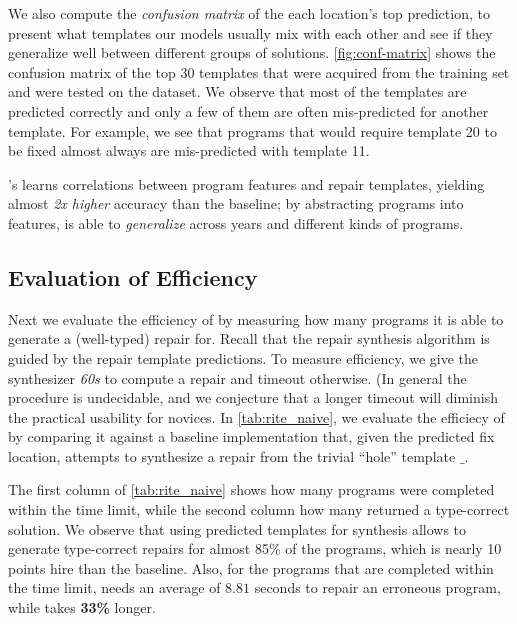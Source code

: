 %
We also compute the \emph{confusion matrix} of the each location's
top prediction, to present what templates our models usually mix
with each other and see if they generalize well between different
groups of solutions.
%
\autoref{fig:conf-matrix} shows the confusion matrix of the
top 30 templates that were acquired from the training set
and were tested on the \FALL dataset.
%
We observe that most of the templates are predicted correctly
and only a few of them are often mis-predicted for another template.
%
For example, we see that programs that would require template 20
to be fixed almost always are mis-predicted with template 11.


\begin{framed}
  \noindent \toolname's learns correlations between program features and repair
  templates, yielding almost \emph{2x higher} accuracy than the baseline;
  by abstracting programs into features, \toolname is able
  to \emph{generalize} across years and different kinds of programs.
\end{framed}


\subsection{Evaluation of Efficiency}
\label{sec:eval:efficiency}
\label{subsec:eval:man_rep_qual_eval}

Next we evaluate the efficiency of \toolname by measuring how many
programs it is able to generate a (well-typed) repair for.
%
Recall that the repair synthesis algorithm is guided by the
repair template predictions.
%
To measure efficiency, we give the synthesizer \emph{60s} to
compute a repair and timeout otherwise. (In general the procedure
is undecidable, and we conjecture that a longer timeout will diminish
the practical usability for novices.
%
In \autoref{tab:rite_naive}, we evaluate the efficiecy of \toolname
by comparing it against a baseline \naive implementation that, given
the predicted fix location, attempts to synthesize a repair from the
trivial ``hole'' template $\_$.

The first column of \autoref{tab:rite_naive} shows how many
programs were completed within the time limit, while the second
column how many returned a type-correct solution.
%
We observe that using predicted templates for synthesis allows
\toolname to generate type-correct repairs for almost 85\% of
the programs, which is nearly 10 points hire than the \naive
baseline. Also, for the programs that are completed within
the time limit, \toolname needs an average of $8.81$ seconds
to repair an erroneous program, while \naive takes
\textbf{33\%} longer.


